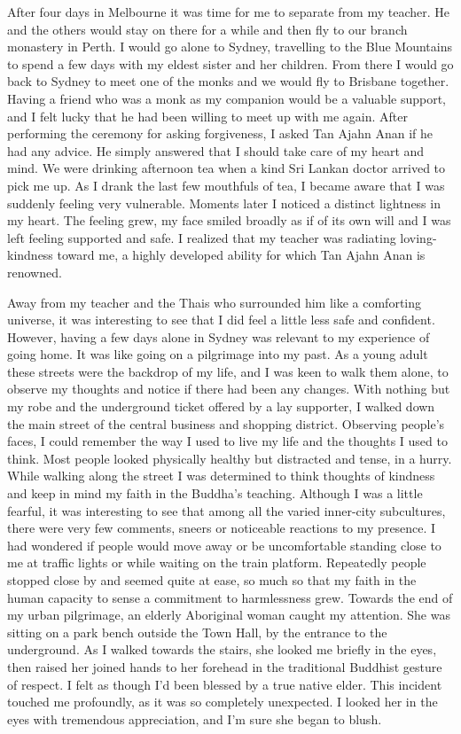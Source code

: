 After four days in Melbourne it was time for me to separate from my
teacher. He and the others would stay on there for a while and then fly
to our branch monastery in Perth. I would go alone to Sydney, travelling
to the Blue Mountains to spend a few days with my eldest sister and her
children. From there I would go back to Sydney to meet one of the monks
and we would fly to Brisbane together. Having a friend who was a monk as
my companion would be a valuable support, and I felt lucky that he had
been willing to meet up with me again. After performing the ceremony for
asking forgiveness, I asked Tan Ajahn Anan if he had any advice. He
simply answered that I should take care of my heart and mind. We were
drinking afternoon tea when a kind Sri Lankan doctor arrived to pick me
up. As I drank the last few mouthfuls of tea, I became aware that I was
suddenly feeling very vulnerable. Moments later I noticed a distinct
lightness in my heart. The feeling grew, my face smiled broadly as if of
its own will and I was left feeling supported and safe. I realized that
my teacher was radiating loving-kindness toward me, a highly developed
ability for which Tan Ajahn Anan is renowned.

Away from my teacher and the Thais who surrounded him like a comforting
universe, it was interesting to see that I did feel a little less safe
and confident. However, having a few days alone in Sydney was relevant
to my experience of going home. It was like going on a pilgrimage into
my past. As a young adult these streets were the backdrop of my life,
and I was keen to walk them alone, to observe my thoughts and notice if
there had been any changes. With nothing but my robe and the underground
ticket offered by a lay supporter, I walked down the main street of the
central business and shopping district. Observing people's faces, I
could remember the way I used to live my life and the thoughts I used to
think. Most people looked physically healthy but distracted and tense,
in a hurry. While walking along the street I was determined to think
thoughts of kindness and keep in mind my faith in the Buddha's teaching.
Although I was a little fearful, it was interesting to see that among
all the varied inner-city subcultures, there were very few comments,
sneers or noticeable reactions to my presence. I had wondered if people
would move away or be uncomfortable standing close to me at traffic
lights or while waiting on the train platform. Repeatedly people stopped
close by and seemed quite at ease, so much so that my faith in the human
capacity to sense a commitment to harmlessness grew. Towards the end of
my urban pilgrimage, an elderly Aboriginal woman caught my attention.
She was sitting on a park bench outside the Town Hall, by the entrance
to the underground. As I walked towards the stairs, she looked me
briefly in the eyes, then raised her joined hands to her forehead in the
traditional Buddhist gesture of respect. I felt as though I'd been
blessed by a true native elder. This incident touched me profoundly, as
it was so completely unexpected. I looked her in the eyes with
tremendous appreciation, and I'm sure she began to blush.

